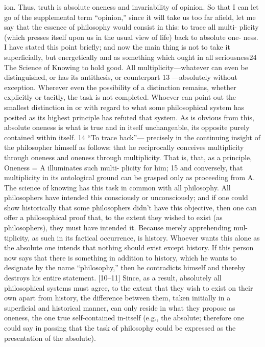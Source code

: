 ion. Thus, truth is absolute oneness and invariability of opinion. So that I can
let go of the supplemental term “opinion,” since it will take us too far afield, let
me say that the essence of philosophy would consist in this: to trace all multi-
plicity (which presses itself upon us in the usual view of life) back to absolute one-
ness. I have stated this point briefly; and now the main thing is not to take it
superficially, but energetically and as something which ought in all seriousness24
The Science of Knowing
to hold good. All multiplicity—whatever can even be distinguished, or has its
antithesis, or counterpart 13 —absolutely without exception. Wherever even the
possibility of a distinction remains, whether explicitly or tacitly, the task is not
completed. Whoever can point out the smallest distinction in or with regard to
what some philosophical system has posited as its highest principle has refuted
that system.
As is obvious from this, absolute oneness is what is true and in itself
unchangeable, its opposite purely contained within itself. 14 “To trace back”—
precisely in the continuing insight of the philosopher himself as follows: that
he reciprocally conceives multiplicity through oneness and oneness through
multiplicity. That is, that, as a principle, Oneness = A illuminates such multi-
plicity for him; 15 and conversely, that multiplicity in its ontological ground can
be grasped only as proceeding from A.
The science of knowing has this task in common with all philosophy.
All philosophers have intended this consciously or unconsciously; and if one
could show historically that some philosophers didn’t have this objective, then
one can offer a philosophical proof that, to the extent they wished to exist (as
philosophers), they must have intended it. Because merely apprehending mul-
tiplicity, as such in its factical occurrence, is history. Whoever wants this alone
as the absolute one intends that nothing should exist except history. If this
person now says that there is something in addition to history, which he wants
to designate by the name “philosophy,” then he contradicts himself and
thereby destroys his entire statement.
[10–11] Since, as a result, absolutely all philosophical systems must
agree, to the extent that they wish to exist on their own apart from history, the
difference between them, taken initially in a superficial and historical manner,
can only reside in what they propose as oneness, the one true self-contained
in-itself (e.g., the absolute; therefore one could say in passing that the task of
philosophy could be expressed as the presentation of the absolute).
